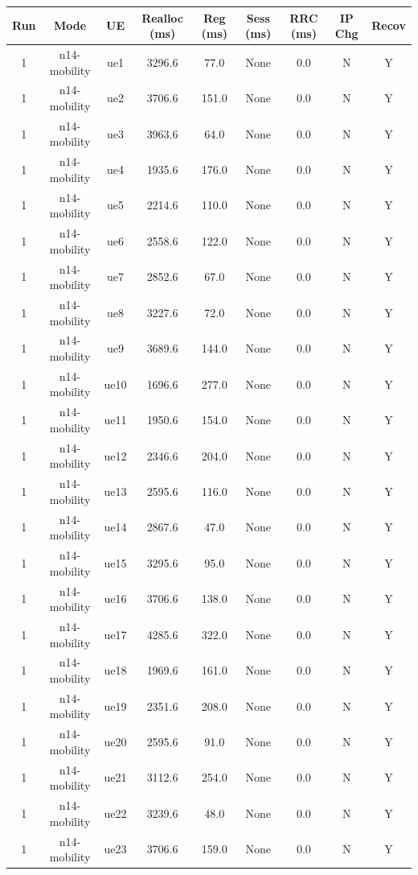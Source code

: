 \begin{table}[ht]
\centering
\begin{tabular}{|c|c|c|c|c|c|c|c|c|}
\hline
Run & Mode & UE & Realloc (ms) & Reg (ms) & Sess (ms) & RRC (ms) & IP Chg & Recov \\
\hline
1 & n14-mobility & ue1 & 3296.6 & 77.0 & None & 0.0 & N & Y \\
1 & n14-mobility & ue2 & 3706.6 & 151.0 & None & 0.0 & N & Y \\
1 & n14-mobility & ue3 & 3963.6 & 64.0 & None & 0.0 & N & Y \\
1 & n14-mobility & ue4 & 1935.6 & 176.0 & None & 0.0 & N & Y \\
1 & n14-mobility & ue5 & 2214.6 & 110.0 & None & 0.0 & N & Y \\
1 & n14-mobility & ue6 & 2558.6 & 122.0 & None & 0.0 & N & Y \\
1 & n14-mobility & ue7 & 2852.6 & 67.0 & None & 0.0 & N & Y \\
1 & n14-mobility & ue8 & 3227.6 & 72.0 & None & 0.0 & N & Y \\
1 & n14-mobility & ue9 & 3689.6 & 144.0 & None & 0.0 & N & Y \\
1 & n14-mobility & ue10 & 1696.6 & 277.0 & None & 0.0 & N & Y \\
1 & n14-mobility & ue11 & 1950.6 & 154.0 & None & 0.0 & N & Y \\
1 & n14-mobility & ue12 & 2346.6 & 204.0 & None & 0.0 & N & Y \\
1 & n14-mobility & ue13 & 2595.6 & 116.0 & None & 0.0 & N & Y \\
1 & n14-mobility & ue14 & 2867.6 & 47.0 & None & 0.0 & N & Y \\
1 & n14-mobility & ue15 & 3295.6 & 95.0 & None & 0.0 & N & Y \\
1 & n14-mobility & ue16 & 3706.6 & 138.0 & None & 0.0 & N & Y \\
1 & n14-mobility & ue17 & 4285.6 & 322.0 & None & 0.0 & N & Y \\
1 & n14-mobility & ue18 & 1969.6 & 161.0 & None & 0.0 & N & Y \\
1 & n14-mobility & ue19 & 2351.6 & 208.0 & None & 0.0 & N & Y \\
1 & n14-mobility & ue20 & 2595.6 & 91.0 & None & 0.0 & N & Y \\
1 & n14-mobility & ue21 & 3112.6 & 254.0 & None & 0.0 & N & Y \\
1 & n14-mobility & ue22 & 3239.6 & 48.0 & None & 0.0 & N & Y \\
1 & n14-mobility & ue23 & 3706.6 & 159.0 & None & 0.0 & N & Y \\

\end{tabular}
\end{table}
